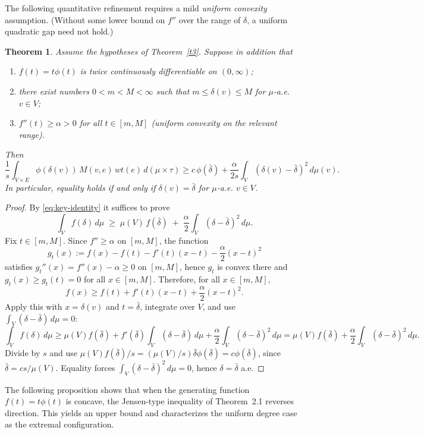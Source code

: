 \documentclass[final,1p,times]{elsarticle}
\newtheorem{thm}{Theorem}[section]
\begin{document}
The following quantitative refinement requires a mild \emph{uniform convexity} assumption.
(Without some lower bound on \(f''\) over the range of \(\delta\), a uniform quadratic gap need not hold.)

\begin{thm}
\label{thm:stability-proof}
Assume the hypotheses of Theorem~\ref{t3}. Suppose in addition that
\begin{enumerate}
\item[\textnormal{(a)}] \(f(t)=t\phi(t)\) is twice continuously differentiable on \((0,\infty)\);
\item[\textnormal{(b)}] there exist numbers \(0<m<M<\infty\) such that \(m\le \delta(v)\le M\) for \(\mu\)-a.e. \(v\in V\);
\item[\textnormal{(c)}] \(f''(t)\ge \alpha>0\) for all \(t\in[m,M]\) \textnormal{(uniform convexity on the relevant range)}.
\end{enumerate}
Then
\[
\frac{1}{s}\int_{V\times E}\phi(\delta(v))\,M(v,e)\,wt(e)\,d(\mu\times\tau)
\ge
c\,\phi(\bar\delta)
+\frac{\alpha}{2s}\int_V (\delta(v)-\bar\delta)^2\,d\mu(v).
\]
In particular, equality holds if and only if \(\delta(v)=\bar\delta\) for \(\mu\)-a.e. \(v\in V\).
\end{thm}

\begin{proof}
By \eqref{eq:key-identity} it suffices to prove
\[
\int_V f(\delta)\,d\mu \;\ge\; \mu(V)\,f(\bar\delta)\;+\;\frac{\alpha}{2}\int_V(\delta-\bar\delta)^2\,d\mu.
\]
Fix \(t\in[m,M]\). Since \(f''\ge\alpha\) on \([m,M]\), the function
\[
g_t(x):=f(x)-f(t)-f'(t)(x-t)-\frac{\alpha}{2}(x-t)^2
\]
satisfies \(g_t''(x)=f''(x)-\alpha\ge 0\) on \([m,M]\), hence \(g_t\) is convex there and
\(g_t(x)\ge g_t(t)=0\) for all \(x\in[m,M]\). Therefore, for all \(x\in[m,M]\),
\[
f(x)\ge f(t)+f'(t)(x-t)+\frac{\alpha}{2}(x-t)^2.
\]
Apply this with \(x=\delta(v)\) and \(t=\bar\delta\), integrate over \(V\), and use
\(\int_V(\delta-\bar\delta)\,d\mu=0\):
\[
\int_V f(\delta)\,d\mu
\ge
\mu(V)f(\bar\delta)+f'(\bar\delta)\int_V(\delta-\bar\delta)\,d\mu+\frac{\alpha}{2}\int_V(\delta-\bar\delta)^2\,d\mu
=
\mu(V)f(\bar\delta)+\frac{\alpha}{2}\int_V(\delta-\bar\delta)^2\,d\mu.
\]
Divide by \(s\) and use \( \mu(V)f(\bar\delta)/s = (\mu(V)/s)\bar\delta\phi(\bar\delta)=c\phi(\bar\delta)\), since \(\bar\delta=cs/\mu(V)\).
Equality forces \(\int_V(\delta-\bar\delta)^2\,d\mu=0\), hence \(\delta=\bar\delta\) a.e.
\end{proof}

The following proposition shows that when the generating function $f(t)=t\phi(t)$ is concave,
the Jensen-type inequality of Theorem~2.1 reverses direction. This yields an upper bound
and characterizes the uniform degree case as the extremal configuration.
\end{document}
